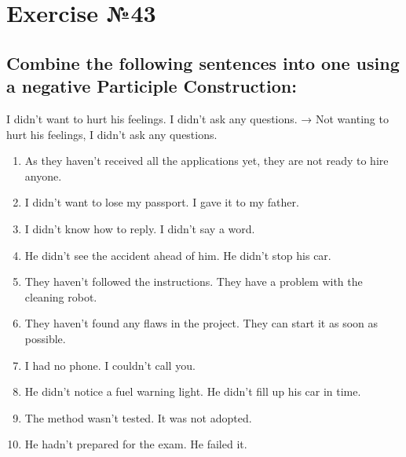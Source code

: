 \section{Exercise №43}
\subsection*{Combine the following sentences into one using a negative Participle Construction:}

 I didn’t want to hurt his feelings. I didn’t ask any questions. → Not wanting to hurt his
feelings, I didn’t ask any questions.

\begin{enumerate}
      \item As they haven't received all the applications yet, they are not ready to hire anyone.
      \item I didn't want to lose my passport. I gave it to my father.
      \item I didn't know how to reply. I didn't say a word.
      \item He didn't see the accident ahead of him. He didn't stop his car.
      \item They haven't followed the instructions. They have a problem with the cleaning robot.
      \item They haven't found any flaws in the project. They can start it as soon as possible.
      \item I had no phone. I couldn't call you.
      \item He didn't notice a fuel warning light. He didn't fill up his car in time.
      \item The method wasn't tested. It was not adopted.
      \item He hadn't prepared for the exam. He failed it.
\end{enumerate}

